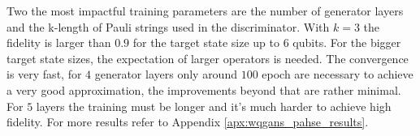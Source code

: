 Two the most impactful training parameters are the number of
generator layers and the k-length of Pauli strings used in the discriminator. With
$k=3$ the fidelity is larger than $0.9$ for the target state size up to $6$ qubits.
For the bigger target state sizes, the expectation of larger operators is needed. The convergence is
very fast, for $4$ generator layers only around $100$ epoch are necessary to
achieve a very good approximation, the improvements beyond that are rather
minimal. For $5$ layers the training must be longer and it's much harder to
achieve high fidelity. For more results refer to Appendix \ref{apx:wqgans_pahse_results}.



\begin{figure}[htbp!]
  \captionsetup[subfigure]{labelformat=empty}
  \centering


\end{figure}
